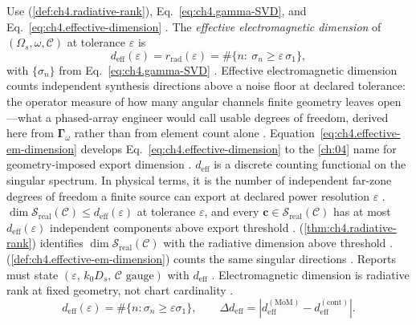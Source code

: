 Use (\ref{def:ch4.radiative-rank}), Eq.~\eqref{eq:ch4.gamma-SVD}, and Eq.~\eqref{eq:ch4.effective-dimension}
\cite{harrington2001}.
\label{def:ch4.effective-em-dimension}
The \emph{effective electromagnetic dimension} of \((\Omega_{s},\omega,\mathcal{C})\) at tolerance \(\varepsilon\) is
\begin{equation}
\label{eq:ch4.effective-em-dimension}
d_{\mathrm{eff}}(\varepsilon)
=
r_{\mathrm{rad}}(\varepsilon)
=
\#\big\{n:\ \sigma_{n}\ge\varepsilon\,\sigma_{1}\big\},
\end{equation}
with \(\{\sigma_{n}\}\) from Eq.~\eqref{eq:ch4.gamma-SVD} \cite{stratton1941}.
Effective electromagnetic dimension counts independent synthesis directions above a noise floor at declared tolerance: the operator measure of how many angular channels finite geometry leaves open---what a phased-array engineer would call usable degrees of freedom, derived here from $\boldsymbol{\Gamma}_\omega$ rather than from element count alone \cite{hansen1988}.
Equation~\eqref{eq:ch4.effective-em-dimension} develops Eq.~\eqref{eq:ch4.effective-dimension} to the \ref{ch:04}
name for geometry-imposed export dimension \cite{devaney2004}. \(d_{\mathrm{eff}}\) is a discrete counting functional on
the singular spectrum. In physical terms, it is the number of independent far-zone degrees of freedom a finite source can export at declared power
resolution \(\varepsilon\) \cite{hansen1988}.
\label{thm:ch4.dimension-bounds-realizability}
\(\dim\mathcal{S}_{\mathrm{real}}(\mathcal{C})\le d_{\mathrm{eff}}(\varepsilon)\) at tolerance \(\varepsilon\), and every
\(\mathbf{c}\in\mathcal{S}_{\mathrm{real}}(\mathcal{C})\) has at most \(d_{\mathrm{eff}}(\varepsilon)\) independent components above export
threshold \cite{stratton1941}.
(\ref{thm:ch4.radiative-rank}) identifies \(\dim\mathcal{S}_{\mathrm{real}}(\mathcal{C})\) with the radiative dimension above threshold
\cite{harrington2001}. (\ref{def:ch4.effective-em-dimension}) counts the same singular directions \cite{stratton1941}.
Reports must state \((\varepsilon,\,k_{0}D_{s},\,\mathcal{C}\text{ gauge})\) with \(d_{\mathrm{eff}}\)
\cite{hansen1988}.
Electromagnetic dimension is radiative rank at fixed geometry, not chart cardinality \cite{harrington2001}. 
\begin{equation}
\label{eq:ch4.deff-reporting}
d_{\mathrm{eff}}(\varepsilon)=\#\{n:\sigma_{n}\ge\varepsilon\sigma_{1}\},\qquad
\Delta d_{\mathrm{eff}}=|d_{\mathrm{eff}}^{\mathrm{(MoM)}}-d_{\mathrm{eff}}^{\mathrm{(cont)}}|.
\end{equation}
